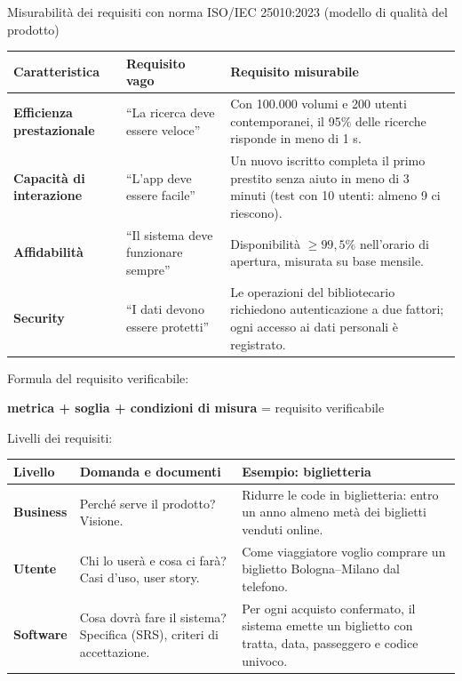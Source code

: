\documentclass[12pt]{extarticle}
\begin{document}
\noindent Misurabilità dei requisiti con norma ISO/IEC 25010:2023 (modello di qualità del prodotto)
\begin{center}
\small
\begin{tabular}{p{3.0cm}p{4.6cm}p{7.6cm}}
    \toprule
    \textbf{Caratteristica} & \textbf{Requisito vago} & \textbf{Requisito misurabile} \\
    \midrule
    \textbf{Efficienza prestazionale} & ``La ricerca deve essere veloce'' & Con 100.000 volumi e 200 utenti contemporanei, il 95\% delle ricerche risponde in meno di 1 s. \\
    \addlinespace
    \textbf{Capacità di interazione} & ``L'app deve essere facile'' & Un nuovo iscritto completa il primo prestito senza aiuto in meno di 3 minuti (test con 10 utenti: almeno 9 ci riescono). \\
    \addlinespace
    \textbf{Affidabilità} & ``Il sistema deve funzionare sempre'' & Disponibilità $\geq 99{,}5\%$ nell'orario di apertura, misurata su base mensile. \\
    \addlinespace
    \textbf{Security} & ``I dati devono essere protetti'' & Le operazioni del bibliotecario richiedono autenticazione a due fattori; ogni accesso ai dati personali è registrato. \\
    \bottomrule
\end{tabular}
\end{center}

\noindent Formula del requisito verificabile:
\begin{center}
    \textbf{metrica + soglia + condizioni di misura} = requisito verificabile
\end{center}

\noindent Livelli dei requisiti:
\begin{center}
\small
\begin{tabular}{p{2.0cm}p{5.2cm}p{8.0cm}}
    \toprule
    \textbf{Livello} & \textbf{Domanda e documenti} & \textbf{Esempio: biglietteria} \\
    \midrule
    \textbf{Business} & Perché serve il prodotto? Visione. & Ridurre le code in biglietteria: entro un anno almeno metà dei biglietti venduti online. \\
    \addlinespace
    \textbf{Utente} & Chi lo userà e cosa ci farà? Casi d'uso, user story. & Come viaggiatore voglio comprare un biglietto Bologna--Milano dal telefono. \\
    \addlinespace
    \textbf{Software} & Cosa dovrà fare il sistema? Specifica (SRS), criteri di accettazione. & Per ogni acquisto confermato, il sistema emette un biglietto con tratta, data, passeggero e codice univoco. \\
    \bottomrule
\end{tabular}
\end{center}
\end{document}
